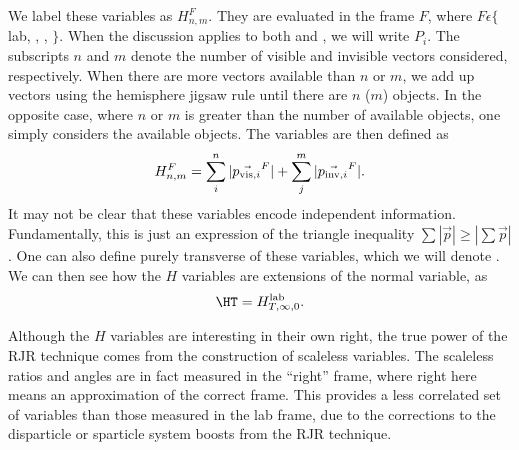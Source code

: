 We label these variables as $H_{n,m}^F$.
They are evaluated in the frame $F$, where $F \xspace \epsilon \xspace \{$lab, \PP, \Pa, \Pb$\}$.
When the discussion applies to both \Pa and \Pb, we will write $P_i$.
The subscripts $n$ and $m$ denote the number of visible and invisible vectors considered, respectively.
When there are more vectors available than $n$ or $m$, we add up vectors using the hemisphere jigsaw rule until there are $n$ ($m$) objects\footnotemark.
In the opposite case, where $n$ or $m$ is greater than the number of available objects, one simply considers the available objects.
The  variables are then defined as
\begin{align}
H^{{F}}_{n,m} = \sum_i^n | \vec{p_{\text{vis},i}}^F | + \sum_j^m | \vec{p_{\text{inv},i}}^F |.
\end{align}
It may not be clear that these variables encode independent information.
Fundamentally, this is just an expression of the triangle inequality $\sum |\vec{p}| \geq |\sum \vec{p}|$.
One can also define purely transverse of these variables, which we will denote .
We can then see how the $H$ variables are extensions of the normal \HT variable, as
\begin{align}
\HT = \HTFnm{\text{lab}}{\infty}{0}.
\end{align}

Although the $H$ variables are interesting in their own right, the true power of the RJR technique comes from the construction of scaleless variables.
The scaleless ratios and angles are in fact measured in the ``right'' frame, where right here means an approximation of the correct frame.
This provides a less correlated set of variables than those measured in the lab frame, due to the corrections to the disparticle or sparticle system boosts from the RJR technique.

